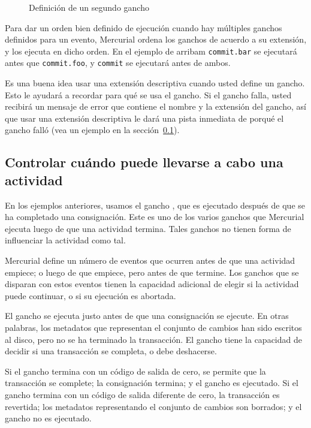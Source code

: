 \begin{figure}[ht]
  \caption{Definición de un segundo gancho }
  \label{ex:hook:ext}
\end{figure}

Para dar un orden bien definido de ejecución cuando hay múltiples
ganchos definidos para un evento, Mercurial ordena los ganchos de
acuerdo a su extensión, y los ejecuta en dicho orden. En el ejemplo de
arribam \texttt{commit.bar} se ejecutará antes que
\texttt{commit.foo}, y \texttt{commit} se ejecutará antes de ambos.

Es una buena idea usar una extensión descriptiva cuando usted define
un gancho. Esto le ayudará a recordar para qué se usa el gancho. Si el
gancho falla, usted recibirá un mensaje de error que contiene el
nombre y la extensión del gancho, así que usar una extensión
descriptiva le dará una pista inmediata de porqué el gancho falló (vea
un ejemplo en la sección~\ref{sec:hook:perm}).

\subsection{Controlar cuándo puede llevarse a cabo una actividad}
\label{sec:hook:perm}

En los ejemplos anteriores, usamos el gancho , que es
ejecutado después de que se ha completado una consignación. Este es
uno de los varios ganchos que Mercurial ejecuta luego de que una
actividad termina. Tales ganchos no tienen forma de influenciar la
actividad como tal.

Mercurial define un número de eventos que ocurren antes de que una
actividad empiece; o luego de que empiece, pero antes de que termine.
Los ganchos que se disparan con estos eventos tienen la capacidad
adicional de elegir si la actividad puede continuar, o si su ejecución
es abortada.

El gancho  se ejecuta justo antes de que una
consignación se ejecute. En otras palabras, los metadatos que
representan el conjunto de cambios han sido escritos al disco, pero no
se ha terminado la transacción. El gancho  tiene la
capacidad de decidir si una transacción se completa, o debe
deshacerse.

Si el gancho  termina con un código de salida de
cero, se permite que la transacción se complete; la consignación
termina; y el gancho  es ejecutado. Si el gancho
 termina con un código de salida diferente de cero,
la transacción es revertida; los metadatos representando el conjunto
de cambios son borrados; y el gancho  no es ejecutado.

